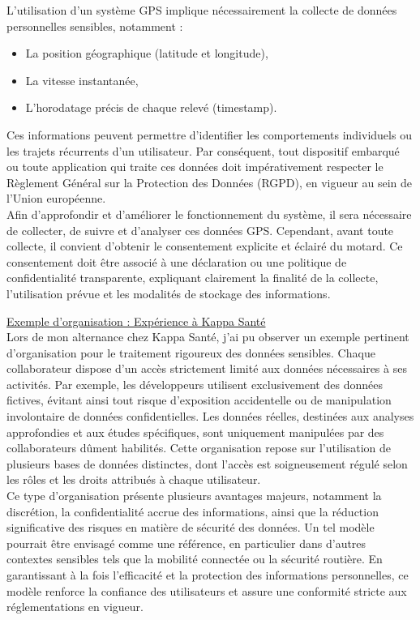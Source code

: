L'utilisation d'un système GPS implique nécessairement la collecte de données personnelles sensibles, notamment :
\begin{itemize}
\item La position géographique (latitude et longitude),
\item La vitesse instantanée,
\item L'horodatage précis de chaque relevé (timestamp).
\end{itemize}
Ces informations peuvent permettre d'identifier les comportements individuels ou les trajets récurrents d'un utilisateur. Par conséquent, tout dispositif embarqué ou toute application qui traite ces données doit impérativement respecter le Règlement Général sur la Protection des Données (RGPD), en vigueur au sein de l'Union européenne.\\
Afin d'approfondir et d'améliorer le fonctionnement du système, il sera nécessaire de collecter, de suivre et d'analyser ces données GPS. Cependant, avant toute collecte, il convient d'obtenir le consentement explicite et éclairé du motard. Ce consentement doit être associé à une déclaration ou une politique de confidentialité transparente, expliquant clairement la finalité de la collecte, l'utilisation prévue et les modalités de stockage des informations.

\vspace{0.5cm}
\underline{Exemple d’organisation : Expérience à Kappa Santé}\\
Lors de mon alternance chez Kappa Santé, j'ai pu observer un exemple pertinent d'organisation pour le traitement rigoureux des données sensibles. Chaque collaborateur dispose d'un accès strictement limité aux données nécessaires à ses activités. Par exemple, les développeurs utilisent exclusivement des données fictives, évitant ainsi tout risque d'exposition accidentelle ou de manipulation involontaire de données confidentielles.
Les données réelles, destinées aux analyses approfondies et aux études spécifiques, sont uniquement manipulées par des collaborateurs dûment habilités. Cette organisation repose sur l'utilisation de plusieurs bases de données distinctes, dont l'accès est soigneusement régulé selon les rôles et les droits attribués à chaque utilisateur.\\
Ce type d'organisation présente plusieurs avantages majeurs, notamment la discrétion, la confidentialité accrue des informations, ainsi que la réduction significative des risques en matière de sécurité des données. Un tel modèle pourrait être envisagé comme une référence, en particulier dans d'autres contextes sensibles tels que la mobilité connectée ou la sécurité routière. En garantissant à la fois l'efficacité et la protection des informations personnelles, ce modèle renforce la confiance des utilisateurs et assure une conformité stricte aux réglementations en vigueur.\\

